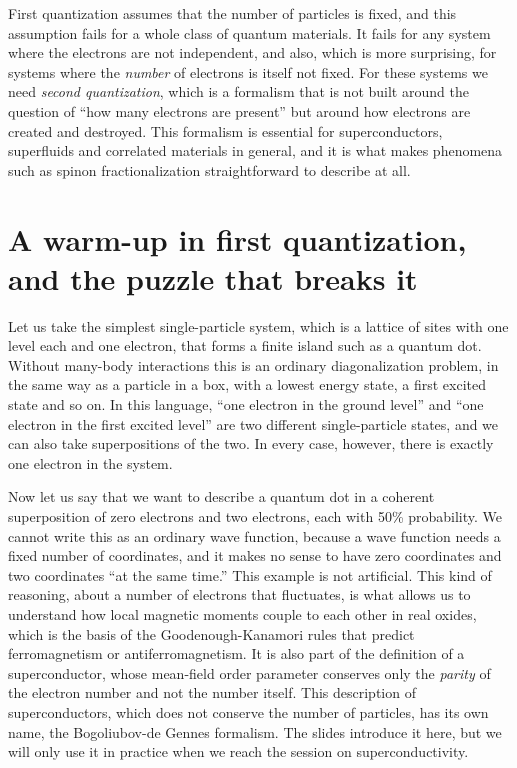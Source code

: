 First quantization assumes that the number of particles is fixed, and this assumption fails for a
whole class of quantum materials. It fails for any system where the electrons are not independent,
and also, which is more surprising, for systems where the \emph{number} of electrons is itself not
fixed. For these systems we need \emph{second quantization}, which is a formalism that is not built
around the question of ``how many electrons are present'' but around how electrons are created and
destroyed. This formalism is essential for superconductors, superfluids and correlated materials in
general, and it is what makes phenomena such as spinon fractionalization straightforward to
describe at all.

\section{A warm-up in first quantization, and the puzzle that breaks it}

Let us take the simplest single-particle system, which is a lattice of sites with one level each
and one electron, that forms a finite island such as a quantum dot. Without many-body interactions
this is an ordinary diagonalization problem, in the same way as a particle in a box, with a lowest
energy state, a first excited state and so on. In this language, ``one electron in the ground
level'' and ``one electron in the first excited level'' are two different single-particle states,
and we can also take superpositions of the two. In every case, however, there is exactly one
electron in the system.

Now let us say that we want to describe a quantum dot in a coherent
superposition of zero electrons and two electrons, each with 50\% probability. We cannot write this
as an ordinary wave function, because a wave function needs a fixed number of coordinates, and it
makes no sense to have zero coordinates and two coordinates ``at the same time.'' This example is
not artificial. This kind of reasoning, about a number of electrons that fluctuates, is what allows
us to understand how local magnetic moments couple to each other in real oxides, which is the basis
of the Goodenough-Kanamori rules that predict ferromagnetism or antiferromagnetism. It is also part
of the definition of a superconductor, whose mean-field order parameter conserves only the
\emph{parity} of the electron number and not the number itself. This description of
superconductors, which does not conserve the number of particles, has its own name, the
Bogoliubov-de Gennes formalism. The slides introduce it here, but we will only use it in practice
when we reach the session on superconductivity.

